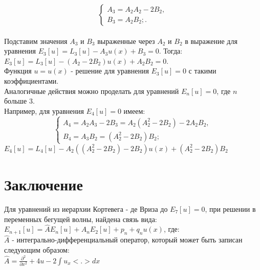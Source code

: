 \documentclass[14pt,a4paper]{article}
\begin{document}
\begin{equation*}
\begin{cases}
A_3 = A_2 A_2 - 2B_2, \\
B_3 = A_2 B_2;.
\end{cases}
\end{equation*} \\
Подставим значения $A_3$ и $B_3$ выраженные через $A_2$ и $B_2$ в выражение для уравнения $E_3 [u] = L_3 [u] - A_3 u(x) + B_3 = 0$. Тогда:\\
$E_3 [u] = L_3 [u] - (A_2 - 2B_2) u(x) + A_2 B_2 = 0$. \\
Функция $u = u(x)$ - решение для уравнения $E_3 [u] = 0$ с такими коэффициентами. \\
Аналогичные действия можно проделать для уравнений $E_n [u] = 0$, где $n$ больше $3$. \\
Например, для уравнения $E_4 [u] = 0$ имеем: \\
\begin{equation*}
\begin{cases}
A_4 = A_2 A_3 - 2B_3 = A_2 (A_{2}^{2} - 2B_2) - 2A_2 B_2, \\
B_4 = A_3 B_2 = (A_{2}^{2} - 2B_2) B_2;
\end{cases}
\end{equation*}
$E_4 [u] = L_4 [u] - A_2 ((A_{2}^{2} - 2B_2) - 2B_2) u(x) + (A_{2}^{2} - 2B_2) B_2$ \\
\section{Заключение}
Для уравнений из иерархии Кортевега - де Вриза до $E_7 [u] = 0$, при решении в переменных бегущей волны, найдена связь вида: \\
$E_{n + 1} [u] = \widehat{A} E_n [u] + A_n E_2 [u] + p_n + q_n u(x)$, где:\\
$\widehat{A}$ - интегрально-дифференциальный оператор, который может быть записан следующим образом: \\
$\widehat{A} = \frac{\partial^2}{\partial x^2} + 4u - 2 \int u_{x} <.> dx$
\end{document}
